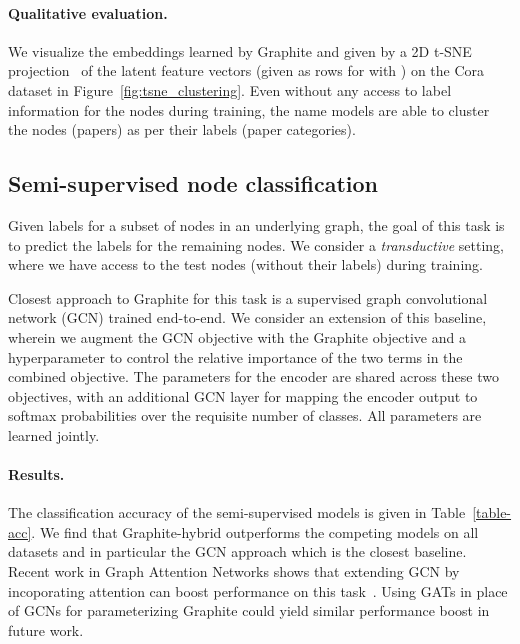 \documentclass{article}
\newcommand{\name}{Graphite}
\begin{document}
\paragraph{Qualitative evaluation.} We  visualize the embeddings learned by \name{} and given by a 2D t-SNE projection~\citep{maaten2008visualizing} of the latent feature vectors (given as rows for  with ) on the Cora dataset in Figure~\ref{fig:tsne_clustering}. Even without any access to label information for the nodes during training, the name{} models are able to cluster the nodes (papers) as per their labels (paper categories).



\subsection{Semi-supervised node classification}


Given labels for a subset of nodes in an underlying graph, the goal of this task is to predict the labels for the remaining nodes. We consider a \textit{transductive} setting, where we have access to the test nodes (without their labels) during training.  

Closest approach to \name{} for this task is a supervised graph convolutional network (GCN) trained end-to-end. We consider an extension of this baseline, wherein we augment the GCN objective with the \name{} objective and a hyperparameter to control the relative importance of the two terms in the combined objective. The parameters  for the encoder are shared across these two objectives, with an additional GCN layer for mapping the encoder output to softmax probabilities over the requisite number of classes. All parameters are learned jointly.

\paragraph{Results.} The classification accuracy of the semi-supervised models is given in Table~\ref{table-acc}. We find that \name{}-hybrid outperforms the competing models on all datasets and in particular the GCN approach which is the closest baseline. Recent work in Graph Attention Networks shows that extending GCN by incoporating attention can boost performance on this task~\citep{velickovic2018graph}. 
Using GATs in place of GCNs for parameterizing \name{} could yield similar performance boost in future work.
\end{document}
